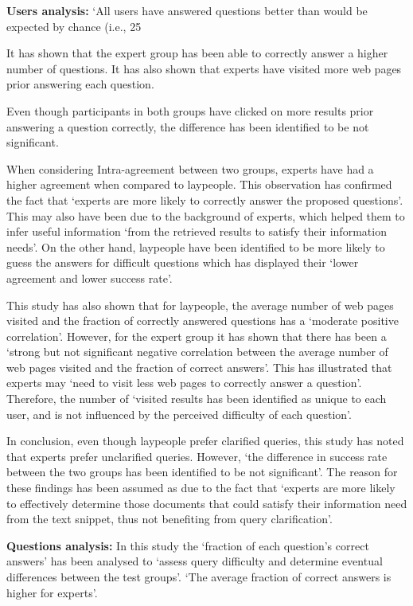 \documentclass[]{article}
\begin{document}
\textbf{Users analysis:} ‘All users have answered questions better than would be expected by chance (i.e., 25 %

It has shown that the expert group has been able to correctly answer a higher number of questions. It has also shown that experts have visited more web pages prior answering each question. 

Even though participants in both groups have clicked on more results prior answering a question correctly, the difference has been identified to be not significant. 

When considering Intra-agreement between two groups, experts have had a higher agreement when compared to laypeople. This observation has confirmed the fact that ‘experts are more likely to correctly answer the proposed questions’. This may also have been due to the background of experts, which helped them to infer useful information ‘from the retrieved results to satisfy their information needs’. On the other hand, laypeople have been identified to be more likely to guess the answers for difficult questions which has displayed their ‘lower agreement and lower success rate’.
 
This study has also shown that for laypeople, the average number of web pages visited and the fraction of correctly answered questions has a ‘moderate positive correlation’. However, for the expert group it has shown that there has been a ‘strong but not significant negative correlation between the average number of web pages visited and the fraction of correct answers’. This has illustrated that experts may ‘need to visit less web pages to correctly answer a question’. Therefore, the number of ‘visited results has been identified as unique to each user, and is not influenced by the perceived difficulty of each question’. 

In conclusion, even though laypeople prefer clarified queries, this study has noted that experts prefer unclarified queries. However, ‘the difference in success rate between the two groups has been identified to be not significant’. The reason for these findings has been assumed as due to the fact that ‘experts are more likely to effectively determine those documents that could satisfy their information need from the text snippet, thus not benefiting from query clarification’.     

\textbf{Questions analysis:} In this study the ‘fraction of each question’s correct answers’ has been analysed to ‘assess query difficulty and determine eventual differences between the test groups’. ‘The average fraction of correct answers is higher for experts’. 
\end{document}
